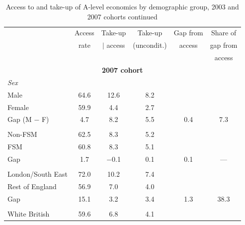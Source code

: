 \begin{table}[htbp]
\ContinuedFloat
\centering
\caption[]{Access to and take-up of A-level economics by demographic group, 2003 and 2007 cohorts continued}
\label{tab:pref_constraint_earlier_continued}
\begin{tabular}{l ccccc}
\toprule
                              & Access     & Take-up    & Take-up    & Gap from   & Share of   \\
                              & rate       & $|$ access & (uncondit.)& access     & gap from   \\
                              &            &            &            &            & access     \\
\midrule
\multicolumn{6}{c}{\textbf{2007 cohort}} \\
\midrule
\multicolumn{6}{l}{\textit{Sex}} \\
Male                          & 64.6         & 12.6         & 8.2         &            &            \\
Female                        & 59.9         & 4.4         & 2.7         &            &            \\
Gap (M $-$ F)                 & 4.7         & 8.2         & 5.5         & 0.4         & 7.3         \\
\addlinespace
\multicolumn{6}{l}{\textit{Socioeconomic status}} \\
Non-FSM                       & 62.5         & 8.3         & 5.2         &            &            \\
FSM                           & 60.8         & 8.3         & 5.1         &            &            \\
Gap                           & 1.7         & $-$0.1         & 0.1         & 0.1         & ---         \\
\addlinespace
\multicolumn{6}{l}{\textit{Region}} \\
London/South East             & 72.0         & 10.2         & 7.4         &            &            \\
Rest of England               & 56.9         & 7.0         & 4.0         &            &            \\
Gap                           & 15.1         & 3.2         & 3.4         & 1.3         & 38.3         \\
\addlinespace
\multicolumn{6}{l}{\textit{Ethnicity}} \\
White British                 & 59.6         & 6.8         & 4.1         &            &            \\

\end{tabular}
\end{table}
